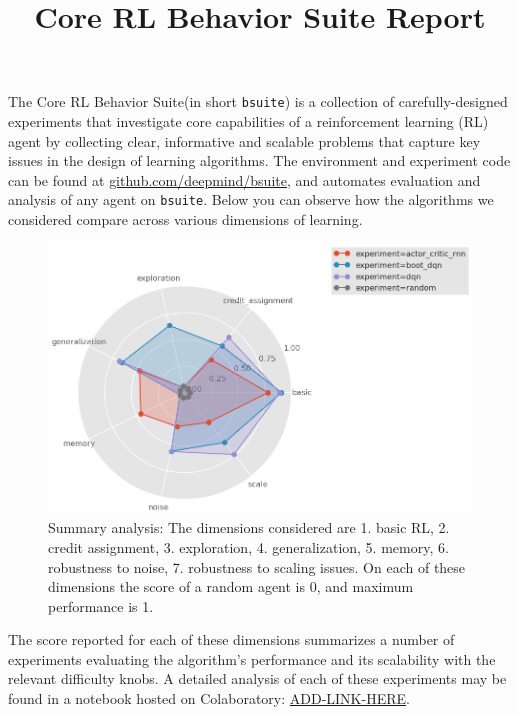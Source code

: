 \documentclass{article}
\title{Core RL Behavior Suite Report}
\newcommand{\fullname}{Core RL Behavior Suite}
\newcommand{\shortname}{\texttt{bsuite}}
\newcommand{\github}{\url{github.com/deepmind/bsuite}}
\newcommand{\fullreport}{\url{ADD-LINK-HERE}}
\begin{document}
\vspace*{-100pt}
{\let\newpage\relax\maketitle}

\vspace*{20pt}

The \fullname  (in short \shortname)  is a collection of carefully-designed
experiments that investigate core capabilities of a reinforcement learning (RL)
agent by collecting clear, informative and scalable problems that capture key
issues in the design of learning algorithms. The environment and experiment code
can be found at \github, and automates evaluation and analysis of any agent on
\shortname. Below you can observe how the algorithms we considered compare
across various dimensions of learning.

\begin{figure}[h!]
\centering
\vspace*{20pt}
\includegraphics[width=0.9\linewidth]{images/radar_plot.png}
\caption{Summary analysis: The dimensions considered are 1. basic RL,
2. credit assignment, 3. exploration, 4. generalization, 5. memory,
6. robustness to noise, 7. robustness to scaling issues. On each of these
dimensions the score of a random agent is 0, and maximum performance is 1.}
\label{fig:universe}
\vspace*{20pt}
\end{figure}

\noindent The score reported for each of these dimensions summarizes a number
of experiments evaluating the algorithm's performance and its scalability with
the relevant difficulty knobs. A detailed analysis of each of these experiments
may be found in a notebook hosted on Colaboratory: \fullreport.
\end{document}
